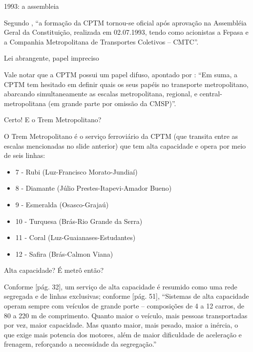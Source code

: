 \documentclass[spectratio=169, portuguese]{beamer}
\begin{document}
\begin{frame}{1993: a assembleia}
	
	Segundo , ``a formação da CPTM tornou-se oficial após aprovação na Assembléia Geral da	Constituição, realizada em 02.07.1993, tendo como acionistas a Fepasa e a Companhia Metropolitana de Transportes Coletivos – CMTC''.
	
\end{frame}


\begin{frame}{Lei abrangente, papel impreciso}
	
	Vale notar que a CPTM possui um papel difuso, apontado por : ``Em suma, a CPTM tem hesitado em definir quais os seus papéis no transporte metropolitano, abarcando simultaneamente as escalas metropolitana, regional, e central-metropolitana (em grande parte por omissão da CMSP)''. 
	
\end{frame}


\begin{frame}{Certo! E o Trem Metropolitano?}
	
	O Trem Metropolitano é o serviço ferroviário da CPTM (que transita entre as escalas mencionadas no slide anterior) que tem alta capacidade e opera por meio de seis linhas:

	\begin{itemize}
		\item 7 - Rubi (Luz-Francisco Morato-Jundiaí)
		\item 8 - Diamante (Júlio Prestes-Itapevi-Amador Bueno)
		\item 9 - Esmeralda (Osasco-Grajaú)
		\item 10 - Turquesa (Brás-Rio Grande da Serra)
		\item 11 - Coral (Luz-Guaianases-Estudantes)
		\item 12 - Safira (Brás-Calmon Viana)
	\end{itemize}
	
\end{frame}


\begin{frame}{Alta capacidade? É metrô então?}
	
	Conforme [pág. 32], um serviço de alta capacidade é resumido como uma rede segregada e de linhas exclusivas; conforme [pág. 51], ``Sistemas  de  alta  capacidade  operam  sempre  com  veículos  de  grande porte – composições de 4 a 12 carros, de 80 a 220 m de comprimento. Quanto  maior  o  veículo,  mais  pessoas  transportadas  por  vez,  maior capacidade.  Mas  quanto  maior,  mais  pesado,  maior  a  inércia,  o  que exige  mais  potencia  dos  motores,  além  de  maior  dificuldade  de aceleração e frenagem, reforçando a necessidade da segregação.''
	
\end{frame}
\end{document}
